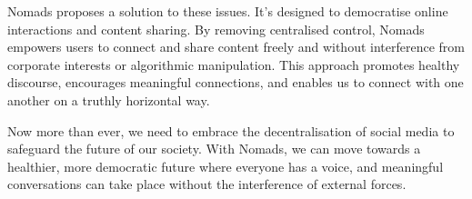 \documentclass{sistedes}
\begin{document}
Nomads proposes a solution to these issues. It's designed to democratise online interactions and content sharing. By removing centralised control, Nomads empowers users to connect and share content freely and without interference from corporate interests or algorithmic manipulation. This approach promotes healthy discourse, encourages meaningful connections, and enables us to connect with one another on a truthly horizontal way.

Now more than ever, we need to embrace the decentralisation of social media to safeguard the future of our society. With Nomads, we can move towards a healthier, more democratic future where everyone has a voice, and meaningful conversations can take place without the interference of external forces.

\printbibliography
\end{document}

